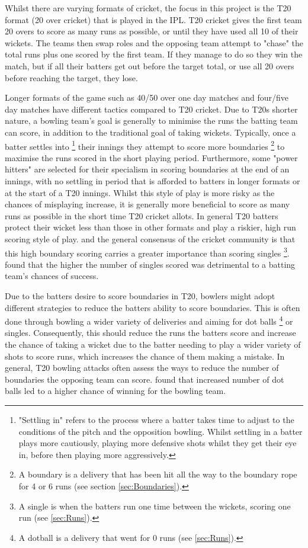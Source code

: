 \documentclass[12pt,a4paper]{report}
\theoremstyle{definition}
\begin{document}
Whilst there are varying formats of cricket, the focus in this project is the T20 format (20 over cricket) that is played in the IPL.
T20 cricket gives the first team 20 overs to score as many runs as possible, or until they have used all 10 of their wickets.
The teams then swap roles and the opposing team attempt to "chase" the total runs plus one scored by the first team. 
If they manage to do so they win the match, but if all their batters get out before the target total, or use all 20 overs before reaching the target, they lose.

Longer formats of the game such as 40/50 over one day matches and four/five day matches have different tactics compared to T20 cricket.
Due to T20s shorter nature, a bowling team's goal is generally to minimise the runs the batting team can score, in addition to the traditional goal of taking wickets.
Typically, once a batter settles into \footnote{"Settling in" refers to the process where a batter takes time to adjust to the conditions of the pitch and the opposition bowling. Whilst settling in a batter plays more cautiously, playing more defensive shots whilst they get their eye in, before then playing more aggressively.} their innings they attempt to score more boundaries \footnote{A boundary is a delivery that has been hit all the way to the boundary rope for 4 or 6 runs (see section \ref{sec:Boundaries}).} to maximise the runs scored in the short playing period.
Furthermore, some "power hitters" are selected for their specialism in scoring boundaries at the end of an innings, with no settling in period that is afforded to batters in longer formats or at the start of a T20 innings.
Whilst this style of play is more risky as the chances of misplaying increase, it is generally more beneficial to score as many runs as possible in the short time T20 cricket allots.
In general T20 batters protect their wicket less than those in other formats and play a riskier, high run scoring style of play.
\citet{Irvine2017} and the general consensus of the cricket community is that this high boundary scoring carries a greater importance than scoring singles \footnote{A single is when the batters run one time between the wickets, scoring one run (see \ref{sec:Runs}).}. 
\citet{Irvine2017} found that the higher the number of singles scored was detrimental to a batting team's chances of success.

Due to the batters desire to score boundaries in T20, bowlers might adopt different strategies to reduce the batters ability to score boundaries. 
This is often done through bowling a wider variety of deliveries and aiming for dot balls \footnote{A dotball is a delivery that went for 0 runs (see \ref{sec:Runs}).} or singles.
Consequently, this should reduce the runs the batters score and increase the chance of taking a wicket due to the batter needing to play a wider variety of shots to score runs, which increases the chance of them making a mistake.
In general, T20 bowling attacks often assess the ways to reduce the number of boundaries the opposing team can score.
\citet{Irvine2017} found that increased number of dot balls led to a higher chance of winning for the bowling team. 
\end{document}
